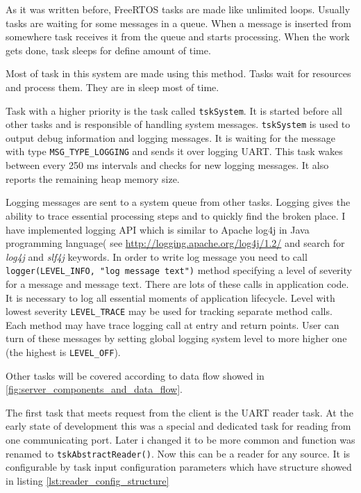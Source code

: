 As it was written before, FreeRTOS tasks are made like unlimited loops.
Usually tasks are waiting for some messages in a queue.
When a message is inserted from somewhere task receives it from the queue and
starts processing. When the work gets done,  task sleeps for define amount of
time. 

Most of task in this system are made using this method. 
Tasks wait for resources and process them. 
They are in sleep most of time.

Task with a higher priority is the task called  \texttt{tskSystem}.
It is started before all other tasks and is responsible of handling system
messages. 
\texttt{tskSystem} is used to output debug information and logging messages.
It is waiting for the message with type \texttt{MSG\_TYPE\_LOGGING} and sends it
over logging UART.
This task wakes between every 250 ms intervals and checks for new logging
messages. It also reports the remaining heap memory size.

Logging messages are sent to a system queue from other tasks.
Logging gives the ability to trace essential processing steps and to quickly
find the broken place.
I have implemented logging API which is similar to Apache log4j in Java
programming language( see \url{http://logging.apache.org/log4j/1.2/} and search
for \textit{log4j} and \textit{slf4j} keywords.
In order to write log message you need to call \texttt{logger(LEVEL\_INFO,
"log message text")} method specifying a level of severity for a message and
message text. There are  lots of these calls in application code. It is
necessary to log all essential moments of application lifecycle. Level with
lowest severity \texttt{LEVEL\_TRACE} may be used for tracking separate method
calls. Each method may have trace logging call at entry and return points.
User can turn of these messages by setting global logging system level to more
higher one (the highest is \texttt{LEVEL\_OFF}).

Other tasks will be covered according to data flow showed in
\autoref{fig:server_components_and_data_flow}.

The first task that meets request from the client is the UART reader task.
At the early state of development this was a special and dedicated task for
reading from one communicating port. Later i changed it to be more common and
function was renamed to \texttt{tskAbstractReader()}. Now this can be a
reader for any source. It is configurable by task input configuration parameters
which have structure showed in listing \ref{lst:reader_config_structure}


